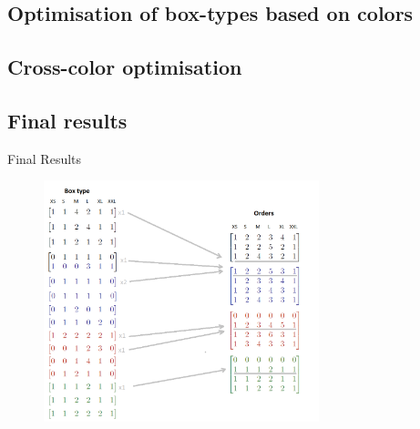 \documentclass{beamer}
\begin{document}
\begin{frame}
\end{frame}

\subsection{Optimisation of box-types based on colors}


\subsection{Cross-color optimisation}


\subsection{Final results}

\begin{frame}{Final Results}
    \begin{figure}
        \centering
        \includegraphics[width=8cm]{./figures/boxtypes.png}        \label{fig:my_label}
    \end{figure}
\end{frame}
\end{document}

